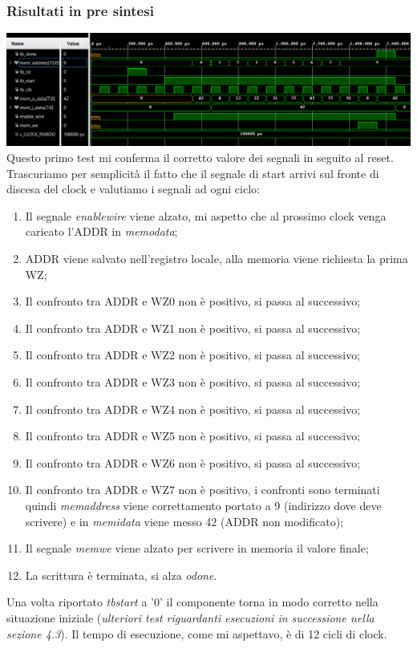 \documentclass{article}
\begin{document}
\subsubsection{Risultati in pre sintesi}
\includegraphics[width=\textwidth]{tb0.png}
Questo primo test mi conferma il corretto valore dei segnali in seguito al reset.
Trascuriamo per semplicità il fatto che il segnale di start arrivi sul fronte di discesa del clock e valutiamo i segnali ad ogni ciclo:
\begin{enumerate}
	\item Il segnale \textit{enable\textunderscore wire} viene alzato, mi aspetto che al prossimo clock venga caricato l'ADDR in \textit{mem\textunderscore o\textunderscore data};
	\item ADDR viene salvato nell'registro locale, alla memoria viene richiesta la prima WZ;
	\item Il confronto tra ADDR e WZ0 non è positivo, si passa al successivo;
	\item Il confronto tra ADDR e WZ1 non è positivo, si passa al successivo;
	\item Il confronto tra ADDR e WZ2 non è positivo, si passa al successivo;
	\item Il confronto tra ADDR e WZ3 non è positivo, si passa al successivo;
	\item Il confronto tra ADDR e WZ4 non è positivo, si passa al successivo;
	\item Il confronto tra ADDR e WZ5 non è positivo, si passa al successivo;
	\item Il confronto tra ADDR e WZ6 non è positivo, si passa al successivo;
	\item Il confronto tra ADDR e WZ7 non è positivo, i confronti sono terminati quindi \textit{mem\textunderscore address} viene correttamento portato a 9 (indirizzo dove deve scrivere) e in \textit{mem\textunderscore i\textunderscore data} viene messo 42 (ADDR non modificato);
	\item Il segnale \textit{mem\textunderscore we} viene alzato per scrivere in memoria il valore finale;
	\item La scrittura è terminata, si alza \textit{o\textunderscore done}.
\end{enumerate}
Una volta riportato \textit{tb\textunderscore start} a '0' il componente torna in modo corretto nella situazione iniziale (\textit{ulteriori test riguardanti esecuzioni in successione nella sezione 4.3}).
Il tempo di esecuzione, come mi aspettavo, è di 12 cicli di clock.
\end{document}
